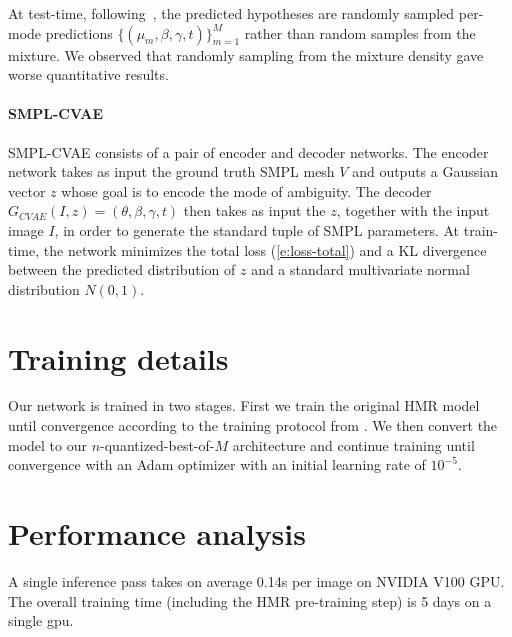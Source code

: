 At test-time, following~\cite{li19generating}, the predicted hypotheses are randomly sampled per-mode predictions $\{(\mu_m, \beta, \gamma, t)\}_{m=1}^M$ rather than random samples from the mixture. We observed that randomly sampling from the mixture density gave worse quantitative results.

\paragraph{SMPL-CVAE} SMPL-CVAE consists of a pair of encoder and decoder networks. The encoder network takes as input the ground truth SMPL mesh $V$ and outputs a Gaussian vector $z$ whose goal is to encode the mode of ambiguity. The decoder $G_{CVAE}(I, z) = (\theta, \beta, \gamma, t)$ then takes as input the $z$, together with the input image $I$, in order to generate the standard tuple of SMPL parameters. At train-time, the network minimizes the total loss (\ref{e:loss-total}) and a KL divergence between the predicted distribution of $z$ and a standard multivariate normal distribution $N(0,1)$.

\section{Training details} \label{s:supp_training}
Our network is trained in two stages. First we train the original HMR model until convergence according to the training protocol from \cite{kolotouros19convolutional}. We then convert the model to our $n$-quantized-best-of-$M$ architecture and continue training until convergence
with an Adam optimizer with an initial learning rate of $10^{-5}$.

\section{Performance analysis} \label{s:supp_perf}
A single inference pass takes on average 0.14s per image on NVIDIA V100 GPU. The overall training time (including the HMR pre-training step) is 5 days on a single gpu.



